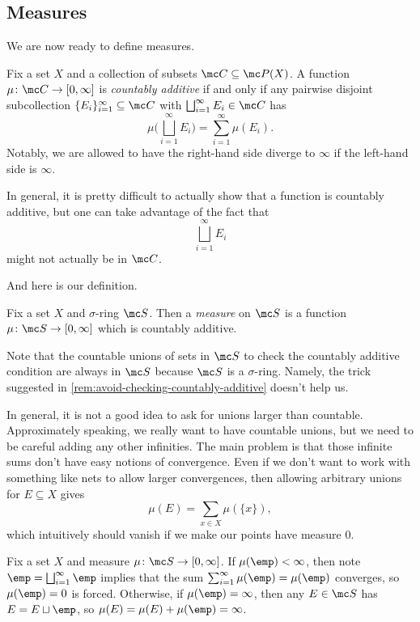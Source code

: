\documentclass[../notes.tex]{subfiles}
\begin{document}
\subsection{Measures}
We are now ready to define measures.
\begin{definition}
	Fix a set $X$ and a collection of subsets $\mc C\subseteq\mc P(X)$. A function $\mu\colon\mc C\to[0,\infty]$ is \textit{countably additive} if and only if any pairwise disjoint subcollection $\{E_i\}_{i=1}^\infty\subseteq\mc C$ with $\bigsqcup_{i=1}^\infty E_i\in\mc C$ has
	\[\mu\Bigg(\bigsqcup_{i=1}^\infty E_i\Bigg)=\sum_{i=1}^\infty\mu(E_i).\]
	Notably, we are allowed to have the right-hand side diverge to $\infty$ if the left-hand side is $\infty$.
\end{definition}
\begin{remark} \label{rem:avoid-checking-countably-additive}
	In general, it is pretty difficult to actually show that a function is countably additive, but one can take advantage of the fact that
	\[\bigsqcup_{i=1}^\infty E_i\]
	might not actually be in $\mc C$.
\end{remark}
And here is our definition.
\begin{definition}[Measure]
	Fix a set $X$ and $\sigma$-ring $\mc S$. Then a \textit{measure} on $\mc S$ is a function $\mu\colon\mc S\to[0,\infty]$ which is countably additive.
\end{definition}
\begin{remark}
	Note that the countable unions of sets in $\mc S$ to check the countably additive condition are always in $\mc S$ because $\mc S$ is a $\sigma$-ring. Namely, the trick suggested in \autoref{rem:avoid-checking-countably-additive} doesn't help us.
\end{remark}
\begin{remark}
	In general, it is not a good idea to ask for unions larger than countable. Approximately speaking, we really want to have countable unions, but we need to be careful adding any other infinities. The main problem is that those infinite sums don't have easy notions of convergence. Even if we don't want to work with something like nets to allow larger convergences, then allowing arbitrary unions for $E\subseteq X$ gives
	\[\mu(E)=\sum_{x\in X}\mu(\{x\}),\]
	which intuitively should vanish if we make our points have measure $0$.
\end{remark}
\begin{remark} \label{rem:measure-emp}
	Fix a set $X$ and measure $\mu\colon\mc S\to[0,\infty]$. If $\mu(\emp)<\infty$, then note $\emp=\bigsqcup_{i=1}^\infty\emp$ implies that the sum $\sum_{i=1}^\infty\mu(\emp)=\mu(\emp)$ converges, so $\mu(\emp)=0$ is forced. Otherwise, if $\mu(\emp)=\infty$, then any $E\in\mc S$ has $E=E\sqcup\emp$, so $\mu(E)=\mu(E)+\mu(\emp)=\infty$.
\end{remark}
\end{document}
